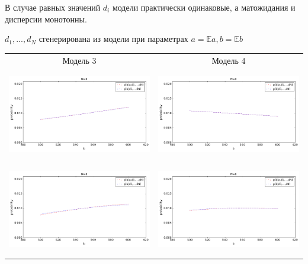 \documentclass[12pt, a4paper]{article}
\begin{document}
			В случае равных значений $d_i$ модели практически одинаковые, а матожидания и дисперсии монотонны.
			
			\newpage
			\begin{center}
			$d_1, ..., d_N$ сгенерирована из модели при параметрах $a = \mathbb{E}a, b = \mathbb{E}b$
			
			\begin{tabular}{ c  c }
  				Модель 3 & Модель 4 \\
  				\includegraphics[width=8cm, height=4cm]{graphs/m3_gen_n0.png} &
  				\includegraphics[width=8cm, height=4cm]{graphs/m4_gen_n0.png} \\
  				
  				\includegraphics[width=8cm, height=4cm]{graphs/m3_gen_n6.png} &
  				\includegraphics[width=8cm, height=4cm]{graphs/m4_gen_n6.png} \\
  				

\end{tabular}
\end{center}
\end{document}
